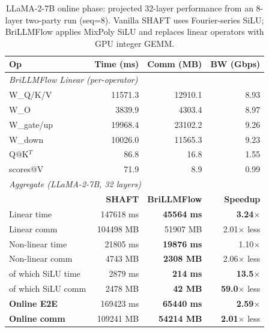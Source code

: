\begin{table}[t]
\centering
\caption{LLaMA-2-7B online phase: projected 32-layer performance from an 8-layer two-party run (seq=8). Vanilla SHAFT uses Fourier-series SiLU; BriLLMFlow applies MixPoly SiLU and replaces linear operators with GPU integer GEMM.}
\label{tab:llama2_hybrid_comparison}
\setlength{\tabcolsep}{4pt}
\footnotesize
\begin{tabular}{lrrr}
\toprule
\textbf{Op} & \textbf{Time (ms)} & \textbf{Comm (MB)} & \textbf{BW (Gbps)} \\
\midrule
\multicolumn{4}{l}{\textit{BriLLMFlow Linear (per-operator)}} \\
W\_Q/K/V      & 11571.3 & 12910.1 & 8.93 \\
W\_O          & 3839.9 & 4303.4 & 8.97 \\
W\_gate/up    & 19968.4 & 23102.2 & 9.26 \\
W\_down       & 10026.0 & 11565.3 & 9.23 \\
Q@K$^T$       & 86.8 & 16.8 & 1.55 \\
scores@V      & 71.9 & 8.9 & 0.99 \\
\midrule
\multicolumn{4}{l}{\textit{Aggregate (LLaMA-2-7B, 32 layers)}} \\
                       & \textbf{SHAFT} & \textbf{BriLLMFlow} & \textbf{Speedup} \\
Linear time            & 147618 ms & \textbf{45564 ms} & \textbf{3.24}$\times$ \\
Linear comm            & 104498 MB & 51907 MB & 2.01$\times$ less \\
Non-linear time        & 21805 ms & \textbf{19876 ms} & 1.10$\times$ \\
Non-linear comm        & 4743 MB & \textbf{2308 MB} & 2.06$\times$ less \\
\quad of which SiLU time & 2879 ms & \textbf{214 ms} & \textbf{13.5}$\times$ \\
\quad of which SiLU comm & 2478 MB & \textbf{42 MB} & \textbf{59.0}$\times$ less \\
\midrule
\textbf{Online E2E}    & 169423 ms & \textbf{65440 ms} & \textbf{2.59}$\times$ \\
\textbf{Online comm}   & 109241 MB & \textbf{54214 MB} & \textbf{2.01}$\times$ less \\
\bottomrule
\end{tabular}
\end{table}
